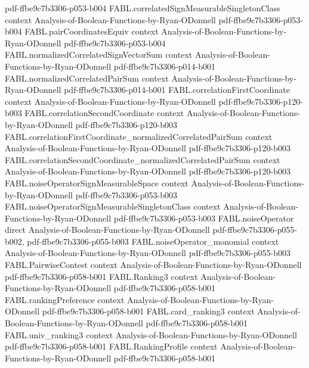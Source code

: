 \begin{theorem}
  {pdf-ffbe9c7b3306-p053-b004}
\proofstep
  {FABL.correlatedSignMeasurableSingletonClass}
  {context}
  {Analysis-of-Boolean-Functions-by-Ryan-ODonnell}
  {pdf-ffbe9c7b3306-p053-b004}
\proofstep
  {FABL.pairCoordinatesEquiv}
  {context}
  {Analysis-of-Boolean-Functions-by-Ryan-ODonnell}
  {pdf-ffbe9c7b3306-p053-b004}
\proofstep
  {FABL.normalizedCorrelatedSignVectorSum}
  {context}
  {Analysis-of-Boolean-Functions-by-Ryan-ODonnell}
  {pdf-ffbe9c7b3306-p014-b001}
\proofstep
  {FABL.normalizedCorrelatedPairSum}
  {context}
  {Analysis-of-Boolean-Functions-by-Ryan-ODonnell}
  {pdf-ffbe9c7b3306-p014-b001}
\proofstep
  {FABL.correlationFirstCoordinate}
  {context}
  {Analysis-of-Boolean-Functions-by-Ryan-ODonnell}
  {pdf-ffbe9c7b3306-p120-b003}
\proofstep
  {FABL.correlationSecondCoordinate}
  {context}
  {Analysis-of-Boolean-Functions-by-Ryan-ODonnell}
  {pdf-ffbe9c7b3306-p120-b003}
\proofstep
  {FABL.correlationFirstCoordinate_normalizedCorrelatedPairSum}
  {context}
  {Analysis-of-Boolean-Functions-by-Ryan-ODonnell}
  {pdf-ffbe9c7b3306-p120-b003}
\proofstep
  {FABL.correlationSecondCoordinate_normalizedCorrelatedPairSum}
  {context}
  {Analysis-of-Boolean-Functions-by-Ryan-ODonnell}
  {pdf-ffbe9c7b3306-p120-b003}
\proofstep
  {FABL.noiseOperatorSignMeasurableSpace}
  {context}
  {Analysis-of-Boolean-Functions-by-Ryan-ODonnell}
  {pdf-ffbe9c7b3306-p053-b003}
\proofstep
  {FABL.noiseOperatorSignMeasurableSingletonClass}
  {context}
  {Analysis-of-Boolean-Functions-by-Ryan-ODonnell}
  {pdf-ffbe9c7b3306-p053-b003}
\proofstep
  {FABL.noiseOperator}
  {direct}
  {Analysis-of-Boolean-Functions-by-Ryan-ODonnell}
  {pdf-ffbe9c7b3306-p055-b002,
    pdf-ffbe9c7b3306-p055-b003}
\proofstep
  {FABL.noiseOperator_monomial}
  {context}
  {Analysis-of-Boolean-Functions-by-Ryan-ODonnell}
  {pdf-ffbe9c7b3306-p055-b003}
\proofstep
  {FABL.PairwiseContest}
  {context}
  {Analysis-of-Boolean-Functions-by-Ryan-ODonnell}
  {pdf-ffbe9c7b3306-p058-b001}
\proofstep
  {FABL.Ranking3}
  {context}
  {Analysis-of-Boolean-Functions-by-Ryan-ODonnell}
  {pdf-ffbe9c7b3306-p058-b001}
\proofstep
  {FABL.rankingPreference}
  {context}
  {Analysis-of-Boolean-Functions-by-Ryan-ODonnell}
  {pdf-ffbe9c7b3306-p058-b001}
\proofstep
  {FABL.card_ranking3}
  {context}
  {Analysis-of-Boolean-Functions-by-Ryan-ODonnell}
  {pdf-ffbe9c7b3306-p058-b001}
\proofstep
  {FABL.univ_ranking3}
  {context}
  {Analysis-of-Boolean-Functions-by-Ryan-ODonnell}
  {pdf-ffbe9c7b3306-p058-b001}
\proofstep
  {FABL.RankingProfile}
  {context}
  {Analysis-of-Boolean-Functions-by-Ryan-ODonnell}
  {pdf-ffbe9c7b3306-p058-b001}

\end{theorem}
